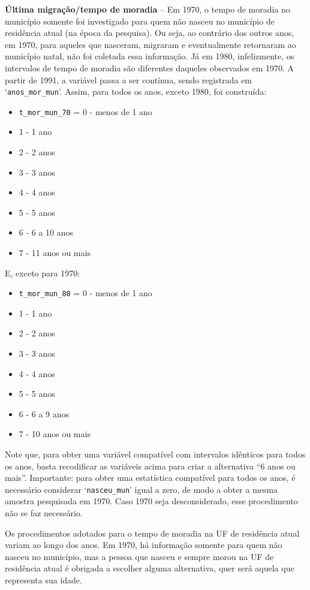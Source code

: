 \documentclass[12pt,a4paper]{article}
\newcommand{\vr}[1]{\texttt{#1}}
\begin{document}
\textbf{Última migração/tempo de moradia} -- Em 1970, o tempo de moradia no município somente foi investigado para quem não nasceu no município de residência atual (na época da pesquisa). Ou seja, ao contrário dos outros anos, em 1970, para aqueles que nasceram, migraram e eventualmente retornaram ao município natal, não foi coletada essa informação. Já em 1980, infelizmente, os intervalos de tempo de moradia são diferentes daqueles observados em 1970. A partir de 1991, a variável passa a ser contínua, sendo registrada em ‘\vr{anos\_mor\_mun}’. Assim, para todos os anos, exceto 1980, foi construída:
\begin{itemize}
  \item \vr{t\_mor\_mun\_70} = 0 - menos de 1 ano
  \item 1 - 1 ano
  \item 2 - 2 anos
  \item 3 - 3 anos
  \item 4 - 4 anos
  \item 5 - 5 anos
  \item 6 - 6 a 10 anos
  \item 7 - 11 anos ou mais
\end{itemize}

E, exceto para 1970:
\begin{itemize}
  \item \vr{t\_mor\_mun\_80} = 0 - menos de 1 ano
  \item 1 - 1 ano
  \item 2 - 2 anos
  \item 3 - 3 anos
  \item 4 - 4 anos
  \item 5 - 5 anos
  \item 6 - 6 a 9 anos
  \item 7 - 10 anos ou mais
\end{itemize}

Note que, para obter uma variável compatível com intervalos idênticos para todos os anos, basta recodificar as variáveis acima para criar a alternativa “6 anos ou mais”. Importante: para obter uma estatística compatível para todos os anos, é necessário considerar ‘\vr{nasceu\_mun}’ igual a zero, de modo a obter a mesma amostra pesquisada em 1970. Caso 1970 seja desconsiderado, esse procedimento não se faz necessário.

Os procedimentos adotados para o tempo de moradia na UF de residência atual variam ao longo dos anos. Em 1970, há informação somente para quem não nasceu no município, mas a pessoa que nasceu e sempre morou na UF de residência atual é obrigada a escolher alguma alternativa, quer será aquela que representa sua idade.
\end{document}
